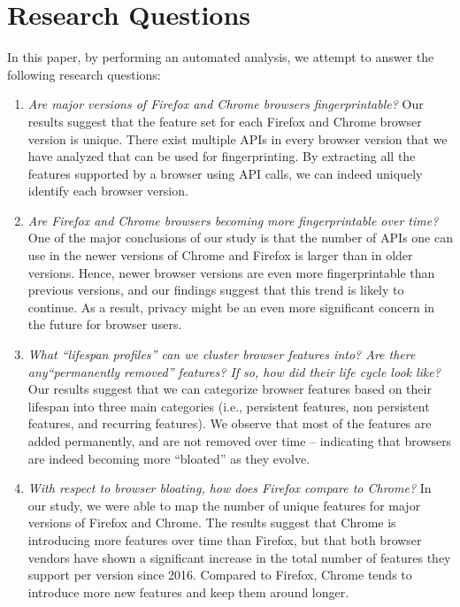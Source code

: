 \section{Research Questions}
\label{sec:introduction}

In this paper, by performing an automated analysis, we attempt to
answer the following research questions:

\begin{enumerate}
  
\item {\em Are major versions of Firefox and Chrome browsers
    fingerprintable?} Our results suggest that the feature set for each
  Firefox and Chrome browser version is unique. There exist multiple
  APIs in every browser version that we have analyzed that can be used
  for fingerprinting. By extracting all the features supported by a
  browser using API calls, we can indeed uniquely identify each
  browser version.

\item {\em Are Firefox and Chrome browsers becoming more
    fingerprintable over time?} One of the major conclusions of our
  study is that the number of APIs one can use in the newer versions
  of Chrome and Firefox is larger than in older versions. Hence, newer
  browser versions are even more fingerprintable than previous
  versions, and our findings suggest that this trend is likely to
  continue. As a result, privacy might be an even more significant
  concern in the future for browser users.
    
\item {\em What ``lifespan profiles'' can we cluster browser features
    into? Are there any``permanently removed'' features? If so, how
    did their life cycle look like?} Our results suggest that we can
  categorize browser features based on their lifespan into three main
  categories (i.e., persistent features, non persistent features, and
  recurring features). We observe that most of the features are added
  permanently, and are not removed over time -- indicating that
  browsers are indeed becoming more ``bloated'' as they evolve.

\item {\em With respect to browser bloating, how does Firefox compare
    to Chrome?} In our study, we were able to map the number of unique
  features for major versions of Firefox and Chrome. The results
  suggest that Chrome is introducing more features over time than
  Firefox, but that both browser vendors have shown a significant
  increase in the total number of features they support per version
  since 2016. Compared to Firefox, Chrome tends to introduce more new
  features and keep them around longer.
 

\end{enumerate}
